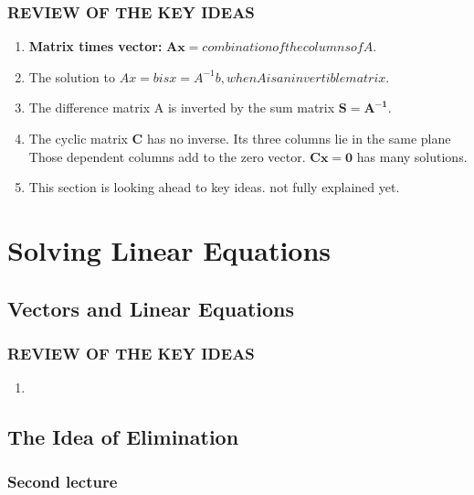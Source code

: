 \documentclass{book}
\begin{document}
\subsection*{REVIEW OF THE KEY IDEAS}
    \begin{enumerate}
        \item  \textbf{Matrix times vector:} \( \mathbf{Ax} = combination of the columns of A.\)
        \item The solution to \( Ax = b is x = A^{-1}b, when A is an invertible matrix.\)
        \item The difference matrix A is inverted by the sum matrix \( \mathbf{S = A^{-1}}\).
        \item The cyclic matrix \textbf{C} has no inverse. Its three columns lie in the same plane\\
        Those dependent columns add to the zero vector. \( \mathbf{Cx = 0}\) has many solutions.
        \item This section is looking ahead to key ideas. not fully explained yet.

    \end{enumerate}





\chapter{Solving Linear Equations}

\section{Vectors and Linear Equations}
\subsection*{REVIEW OF THE KEY IDEAS}
    \begin{enumerate}
        \item  
    \end{enumerate}

\section{The Idea of Elimination}

    \subsection*{Second lecture}
\end{document}
